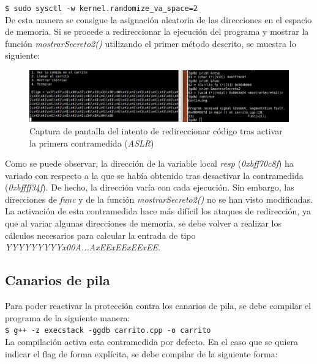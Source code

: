 \documentclass[10pt,a4paper]{article}
\begin{document}
\texttt{\$ sudo sysctl -w kernel.randomize\_va\_space=2}\\

De esta manera se consigue la asignación aleatoria de las direcciones en el espacio de memoria.
Si se procede a redireccionar la ejecución del programa y mostrar la función \textit{mostrarSecreto2()} utilizando el primer método descrito, se muestra lo siguiente:

\begin{figure}[h!]
	\centering
	\includegraphics[scale=0.6]{images/contramedida_1.png}
	\caption{Captura de pantalla del intento de redireccionar código tras activar la primera contramedida (\textit{ASLR})}
	\label{fig:contramedida1}
\end{figure}

Como se puede observar, la dirección de la variable local \textit{resp} (\textit{0xbff70c8f}) ha variado con respecto a la que se había obtenido tras desactivar la contramedida (\textit{0xbffff34f}). De hecho, la dirección varía con cada ejecución. Sin embargo, las direcciones de \textit{func} y de la función \textit{mostrarSecreto2()} no se han visto modificadas.\\
La activación de esta contramedida hace más difícil los ataques de redirección, ya que al variar algunas direcciones de memoria, se debe volver a realizar los cálculos necesarios para calcular la entrada de tipo \textit{YYYYYYYYYx00A...AxEExEExEExEE}.

\subsection{Canarios de pila}

Para poder reactivar la protección contra los canarios de pila, se debe compilar el programa de la siguiente manera: \\

\texttt{\$ g++ -z execstack -ggdb carrito.cpp -o carrito}\\

La compilación activa esta contramedida por defecto. En el caso que se quiera indicar el flag de forma explícita, se debe compilar de la siguiente forma:\\
\end{document}
